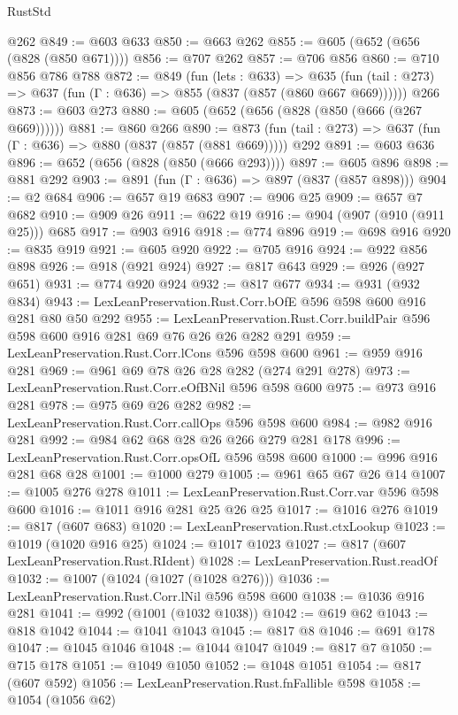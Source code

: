 \begin{lexlean}{RustStd}
\begin{coremodule}
    @262
@849 := @603 @633
@850 := @663 @262
@855 := @605 (@652 (@656 (@828 (@850 @671))))
@856 := @707 @262
@857 := @706 @856
@860 := @710 @856 @786 @788
@872 := @849
    (fun (lets : @633) =>
    @635 (fun (tail : @273) => @637 (fun (Γ : @636) => @855 (@837 (@857 (@860 @667 @669))))))
    @266
@873 := @603 @273
@880 := @605 (@652 (@656 (@828 (@850 (@666 (@267 @669))))))
@881 := @860 @266
@890 := @873 (fun (tail : @273) => @637 (fun (Γ : @636) => @880 (@837 (@857 (@881 @669))))) @292
@891 := @603 @636
@896 := @652 (@656 (@828 (@850 (@666 @293))))
@897 := @605 @896
@898 := @881 @292
@903 := @891 (fun (Γ : @636) => @897 (@837 (@857 @898)))
@904 := @2 @684
@906 := @657 @19 @683
@907 := @906 @25
@909 := @657 @7 @682
@910 := @909 @26
@911 := @622 @19
@916 := @904 (@907 (@910 (@911 @25))) @685
@917 := @903 @916
@918 := @774 @896
@919 := @698 @916
@920 := @835 @919
@921 := @605 @920
@922 := @705 @916
@924 := @922 @856 @898
@926 := @918 (@921 @924)
@927 := @817 @643
@929 := @926 (@927 @651)
@931 := @774 @920 @924
@932 := @817 @677
@934 := @931 (@932 @834)
@943 := LexLeanPreservation.Rust.Corr.bOfE @596 @598 @600 @916 @281 @80 @50 @292
@955 := LexLeanPreservation.Rust.Corr.buildPair @596 @598 @600 @916 @281 @69 @76 @26 @26 @282 @291
@959 := LexLeanPreservation.Rust.Corr.lCons @596 @598 @600
@961 := @959 @916 @281
@969 := @961 @69 @78 @26 @28 @282 (@274 @291 @278)
@973 := LexLeanPreservation.Rust.Corr.eOfBNil @596 @598 @600
@975 := @973 @916 @281
@978 := @975 @69 @26 @282
@982 := LexLeanPreservation.Rust.Corr.callOps @596 @598 @600
@984 := @982 @916 @281
@992 := @984 @62 @68 @28 @26 @266 @279 @281 @178
@996 := LexLeanPreservation.Rust.Corr.opsOfL @596 @598 @600
@1000 := @996 @916 @281 @68 @28
@1001 := @1000 @279
@1005 := @961 @65 @67 @26 @14
@1007 := @1005 @276 @278
@1011 := LexLeanPreservation.Rust.Corr.var @596 @598 @600
@1016 := @1011 @916 @281 @25 @26 @25
@1017 := @1016 @276
@1019 := @817 (@607 @683)
@1020 := LexLeanPreservation.Rust.ctxLookup
@1023 := @1019 (@1020 @916 @25)
@1024 := @1017 @1023
@1027 := @817 (@607 LexLeanPreservation.Rust.RIdent)
@1028 := LexLeanPreservation.Rust.readOf
@1032 := @1007 (@1024 (@1027 (@1028 @276)))
@1036 := LexLeanPreservation.Rust.Corr.lNil @596 @598 @600
@1038 := @1036 @916 @281
@1041 := @992 (@1001 (@1032 @1038))
@1042 := @619 @62
@1043 := @818 @1042
@1044 := @1041 @1043
@1045 := @817 @8
@1046 := @691 @178
@1047 := @1045 @1046
@1048 := @1044 @1047
@1049 := @817 @7
@1050 := @715 @178
@1051 := @1049 @1050
@1052 := @1048 @1051
@1054 := @817 (@607 @592)
@1056 := LexLeanPreservation.Rust.fnFallible @598
@1058 := @1054 (@1056 @62)

\end{coremodule}
\end{lexlean}
